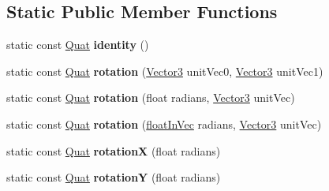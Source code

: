 \subsection*{Static Public Member Functions}
\begin{DoxyCompactItemize}
\item 
\hypertarget{classVectormath_1_1Aos_1_1Quat_a75d5495bd152d9c56873e8cfe25fca44}{static const \hyperlink{classVectormath_1_1Aos_1_1Quat}{Quat} {\bfseries identity} ()}\label{classVectormath_1_1Aos_1_1Quat_a75d5495bd152d9c56873e8cfe25fca44}

\item 
\hypertarget{classVectormath_1_1Aos_1_1Quat_ae4db1dbdf8a42224f4df08f63997db28}{static const \hyperlink{classVectormath_1_1Aos_1_1Quat}{Quat} {\bfseries rotation} (\hyperlink{classVectormath_1_1Aos_1_1Vector3}{Vector3} unit\-Vec0, \hyperlink{classVectormath_1_1Aos_1_1Vector3}{Vector3} unit\-Vec1)}\label{classVectormath_1_1Aos_1_1Quat_ae4db1dbdf8a42224f4df08f63997db28}

\item 
\hypertarget{classVectormath_1_1Aos_1_1Quat_a0888dadf1fd1477fe96d39f9c5551152}{static const \hyperlink{classVectormath_1_1Aos_1_1Quat}{Quat} {\bfseries rotation} (float radians, \hyperlink{classVectormath_1_1Aos_1_1Vector3}{Vector3} unit\-Vec)}\label{classVectormath_1_1Aos_1_1Quat_a0888dadf1fd1477fe96d39f9c5551152}

\item 
\hypertarget{classVectormath_1_1Aos_1_1Quat_ac471b4ba2795cd5a81b6a3a0283b4cfb}{static const \hyperlink{classVectormath_1_1Aos_1_1Quat}{Quat} {\bfseries rotation} (\hyperlink{classVectormath_1_1floatInVec}{float\-In\-Vec} radians, \hyperlink{classVectormath_1_1Aos_1_1Vector3}{Vector3} unit\-Vec)}\label{classVectormath_1_1Aos_1_1Quat_ac471b4ba2795cd5a81b6a3a0283b4cfb}

\item 
\hypertarget{classVectormath_1_1Aos_1_1Quat_a53885cc3224c90ce2ee74baee1b41ab9}{static const \hyperlink{classVectormath_1_1Aos_1_1Quat}{Quat} {\bfseries rotation\-X} (float radians)}\label{classVectormath_1_1Aos_1_1Quat_a53885cc3224c90ce2ee74baee1b41ab9}

\item 
\hypertarget{classVectormath_1_1Aos_1_1Quat_ad6e9ca66249333292a140178654ca447}{static const \hyperlink{classVectormath_1_1Aos_1_1Quat}{Quat} {\bfseries rotation\-Y} (float radians)}\label{classVectormath_1_1Aos_1_1Quat_ad6e9ca66249333292a140178654ca447}


\end{DoxyCompactItemize}

